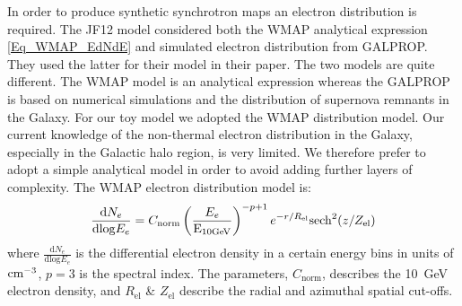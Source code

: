 \documentclass[12pt, a4 paper]{mnras}
\begin{document}
In order to produce synthetic synchrotron maps an electron distribution is required.
The JF12 model considered both the WMAP analytical expression \ref{Eq_WMAP_EdNdE}
and simulated electron distribution from GALPROP. They used the latter for their model in their paper.
The two models are quite different. The WMAP \cite{WMAP_Page} model is an analytical expression whereas the GALPROP \cite{Hammurabi} is based on numerical simulations and the distribution of supernova remnants in the Galaxy. For our toy model we adopted the WMAP distribution model. Our current knowledge of the non-thermal electron distribution in the Galaxy, especially in the Galactic halo region, is very limited. We therefore prefer to adopt a simple analytical model in order to avoid adding further layers of complexity. The WMAP electron distribution model is:
\begin{equation}\label{Eq_WMAP_EdNdE}
    \frac{\mathrm{d}N_e}{\mathrm{dlog}E_{e}} =     C_\mathrm{norm} \left(\frac{E_e}{\rm E_{\rm 10 GeV}}\right)^{-p+1} e^{-r/R_{\mathrm{el}}} \mathrm{sech}^2(z/Z_{\mathrm{el}}) 
\end{equation}
where $\frac{\mathrm{d}N_e}{\mathrm{dlog}E_{e}}$ is the differential electron density in a certain energy bins
in units of ${\rm cm}^{-3}$, $p =3$ is the spectral index. The parameters, $C_\mathrm{norm}$, describes the 10~GeV electron density, and $R_{\mathrm{el}}$ \& $Z_{\mathrm{el}}$ describe the radial and azimuthal spatial cut-offs. 
\end{document}
